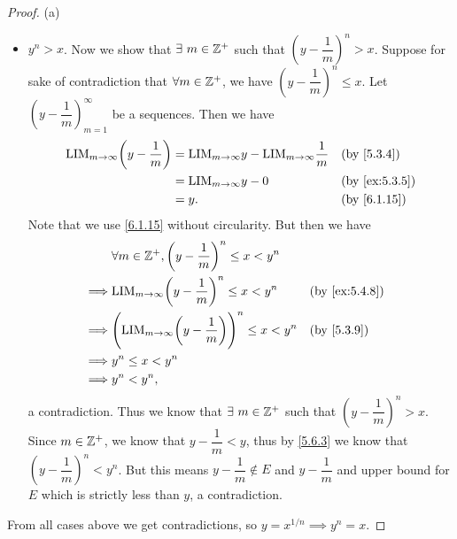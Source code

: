 \begin{proof}{(a)}
\begin{itemize}
          But this means \(y + \dfrac{1}{m} \in E\) and \(y + \dfrac{1}{m} \leq y\), a contradiction.
    \item \(y^n > x\).
          Now we show that \(\exists\ m \in \mathbb{Z}^+\) such that \((y - \dfrac{1}{m})^n > x\).
          Suppose for sake of contradiction that \(\forall m \in \mathbb{Z}^+\), we have \((y - \dfrac{1}{m})^n \leq x\).
          Let \((y - \dfrac{1}{m})_{m = 1}^\infty\) be a sequences.
          Then we have
          \begin{align*}
            \text{LIM}_{m \to \infty} \bigg(y - \dfrac{1}{m}\bigg) & = \text{LIM}_{m \to \infty} y - \text{LIM}_{m \to \infty} \dfrac{1}{m} &  & \text{(by \cref{5.3.4})}    \\
                                                                   & = \text{LIM}_{m \to \infty} y - 0                                      &  & \text{(by \cref{ex:5.3.5})} \\
                                                                   & = y.                                                                   &  & \text{(by \cref{6.1.15})}
          \end{align*}
          Note that we use \cref{6.1.15} without circularity.
          But then we have
          \begin{align*}
                     & \forall m \in \Z^+, \bigg(y - \dfrac{1}{m}\bigg)^n \leq x < y^n                                                    \\
            \implies & \text{LIM}_{m \to \infty} \bigg(y - \dfrac{1}{m}\bigg)^n \leq x < y^n             &  & \text{(by \cref{ex:5.4.8})} \\
            \implies & \Bigg(\text{LIM}_{m \to \infty} \bigg(y - \dfrac{1}{m}\bigg)\Bigg)^n \leq x < y^n &  & \text{(by \cref{5.3.9})}    \\
            \implies & y^n \leq x < y^n                                                                                                   \\
            \implies & y^n < y^n,
          \end{align*}
          a contradiction.
          Thus we know that \(\exists\ m \in \mathbb{Z}^+\) such that \((y - \dfrac{1}{m})^n > x\).
          Since \(m \in \mathbb{Z}^+\), we know that \(y - \dfrac{1}{m} < y\), thus by \cref{5.6.3} we know that \((y - \dfrac{1}{m})^n < y^n\).
          But this means \(y - \dfrac{1}{m} \notin E\) and \(y - \dfrac{1}{m}\) and upper bound for \(E\) which is strictly less than \(y\), a contradiction.
  \end{itemize}
  From all cases above we get contradictions, so \(y = x^{1 / n} \implies y^n = x\).
\end{proof}

